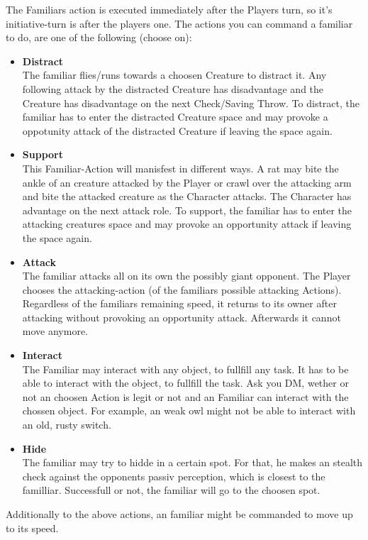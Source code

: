 \documentclass[10pt,twoside,twocolumn,openany]{book}
\begin{document}
The Familiars action is executed immediately after the Players turn, so it's initiative-turn is after the players one. The actions you can command a familiar to do, are one of the following (choose on):

\begin{itemize}
\item \textbf{Distract} \\ The familiar flies/runs towards a choosen Creature to distract it. Any following attack by the distracted Creature has disadvantage and the Creature has disadvantage on the next Check/Saving Throw. To distract, the familiar has to enter the distracted Creature space and may provoke a oppotunity attack of the distracted Creature if leaving the space again.
\item \textbf{Support} \\ This Familiar-Action will manisfest in different ways. A rat may bite the ankle of an creature attacked by the Player or crawl over the attacking arm and bite the attacked creature as the Character attacks. The Character has advantage on the next attack role. To support, the familiar has to enter the attacking creatures space and may provoke an opportunity attack if leaving the space again.
\item \textbf{Attack} \\ The familiar attacks all on its own the possibly giant opponent. The Player chooses the attacking-action (of the familiars possible attacking Actions). Regardless of the familiars remaining speed, it returns to its owner after attacking without provoking an opportunity attack. Afterwards it cannot move anymore.
\item \textbf{Interact} \\ The Familiar may interact with any object, to fullfill any task. It has to be able to interact with the object, to fullfill the task. Ask you DM, wether or not an choosen Action is legit or not and an Familiar can interact with the chossen object. For example, an weak owl might not be able to interact with an old, rusty switch.
\item \textbf{Hide} \\ The familiar may try to hidde in a certain spot. For that, he makes an stealth check against the opponents passiv perception, which is closest to the familliar. Successfull or not, the familiar will go to the choosen spot.
\end{itemize}

Additionally to the above actions, an familiar might be commanded to move up to its speed.
\end{document}
